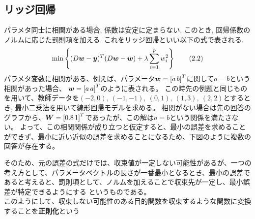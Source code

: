 \documentclass[dvipdfmx,a4j]{jsarticle}
\begin{document}
          \subsection{リッジ回帰}
          パラメタ同士に相関がある場合, 係数は安定に定まらない. このとき, 回帰係数のノルムに応じた罰則項を加える. これをリッジ回帰といい以下の式で表される.
          \begin{align*}
            {\rm min}\left\{ (D\mbox{\boldmath $w$}-\mbox{\boldmath $y$})^{T}(D\mbox{\boldmath $w$}-\mbox{\boldmath $w$})+\lambda \sum_{i=1}^{p}w_{i}^{2}\right\} \tag{2.2}
          \end{align*}
          パラメタ変数に相関がある、例えば、パラメータ$\mbox{\boldmath $w$}=\left[a \, b\right]^{T}$に関して$a=b$という相関があった場合、
          $\mbox{\boldmath $w$}=\left[a\,a\right]^{T}$のように表される。
          この時先の例題と同じものを用いて、教師データを$(-2,0),\ (-1,-1),\ (0,1),\ (1,3),\ (2,2)$とするとき, 最小二乗法を用いて線形回帰モデルを求める。
          相関がない場合は先の回答のグラフから、$\mbox{\boldmath $W$}=\left[0.8\, 1\right]^{T}$であったが、この解は$a=b$という関係を満たさない。
          よって、この相関関係が成り立つと仮定すると、最小の誤差を求めることができず、最小に近い近似の誤差を求めることになるため、下図のように複数の回答が存在する。
          \begin{center}
            \end{center}
          そのため、元の誤差の式だけでは、収束値が一定しない可能性があるが、一つの考え方として、パラメータベクトルの長さが一番最小となるとき、最小の誤差であると考えると、罰則項として、ノルムを加えることで収束先が一定し、最小誤差が特定できるようにする
          というものである。\\
          このようにして、収束しない可能性のある目的関数を収束するような関数に変換することを{\bf 正則化}という
\end{document}
